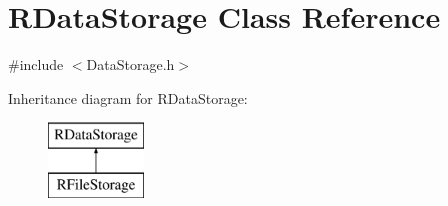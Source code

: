 \hypertarget{classRDataStorage}{
\section{RDataStorage Class Reference}
\label{d5/d77/classRDataStorage}
}


{\ttfamily \#include $<$DataStorage.h$>$}

Inheritance diagram for RDataStorage:\begin{figure}[H]
\begin{center}
\leavevmode
\includegraphics[height=2.000000cm]{d5/d77/classRDataStorage}
\end{center}
\end{figure}
